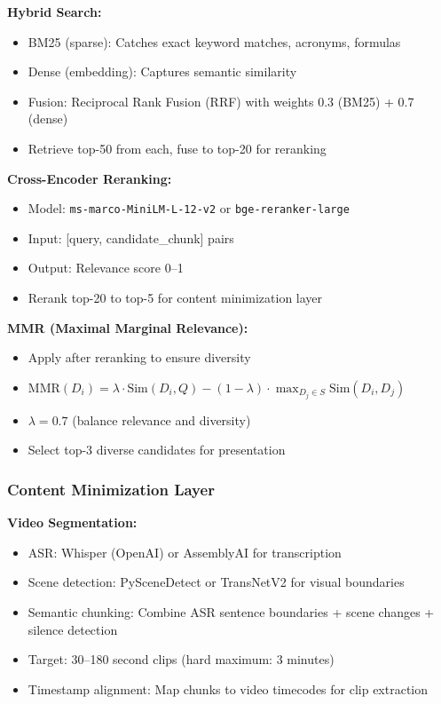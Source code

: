 \documentclass[11pt,letterpaper]{article}
\begin{document}
\textbf{Hybrid Search:}
\begin{itemize}
\item BM25 (sparse): Catches exact keyword matches, acronyms, formulas
\item Dense (embedding): Captures semantic similarity
\item Fusion: Reciprocal Rank Fusion (RRF) with weights 0.3 (BM25) + 0.7 (dense)
\item Retrieve top-50 from each, fuse to top-20 for reranking
\end{itemize}

\textbf{Cross-Encoder Reranking:}
\begin{itemize}
\item Model: \texttt{ms-marco-MiniLM-L-12-v2} or \texttt{bge-reranker-large}
\item Input: [query, candidate\_chunk] pairs
\item Output: Relevance score 0--1
\item Rerank top-20 to top-5 for content minimization layer
\end{itemize}

\textbf{MMR (Maximal Marginal Relevance):}
\begin{itemize}
\item Apply after reranking to ensure diversity
\item $\text{MMR}(D_i) = \lambda \cdot \text{Sim}(D_i, Q) - (1-\lambda) \cdot \max_{D_j \in S} \text{Sim}(D_i, D_j)$
\item $\lambda = 0.7$ (balance relevance and diversity)
\item Select top-3 diverse candidates for presentation
\end{itemize}

\subsubsection{Content Minimization Layer}

\textbf{Video Segmentation:}
\begin{itemize}
\item ASR: Whisper (OpenAI) or AssemblyAI for transcription
\item Scene detection: PySceneDetect or TransNetV2 for visual boundaries
\item Semantic chunking: Combine ASR sentence boundaries + scene changes + silence detection
\item Target: 30--180 second clips (hard maximum: 3 minutes)
\item Timestamp alignment: Map chunks to video timecodes for clip extraction
\end{itemize}
\end{document}
